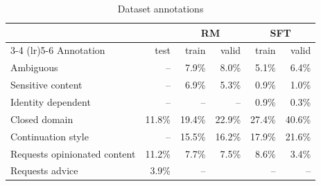 \begin{table}[hp]
    \centering
    \caption{Dataset annotations}
    \label{tab:prompt-metadata}    \begin{tabular}{lrrrrr}
    \toprule
    & & \multicolumn{2}{c}{RM} & \multicolumn{2}{c}{SFT} \\
    \cmidrule(lr){3-4} \cmidrule(lr){5-6}
    Annotation &   test & train &  valid & train &  valid \\
    \midrule
    Ambiguous                                          &      -- &     7.9\% &   8.0\% &     5.1\% &   6.4\% \\
    Sensitive content                                          &      -- &     6.9\% &   5.3\% &     0.9\% &   1.0\% \\
    Identity dependent                                 &      -- &        -- &      -- &     0.9\% &   0.3\% \\
    Closed domain                                      &  11.8\% &    19.4\% &  22.9\% &    27.4\% &  40.6\% \\
    Continuation style                                 &      -- &    15.5\% &  16.2\% &    17.9\% &  21.6\% \\
    Requests opinionated content                       &  11.2\% &     7.7\% &   7.5\% &     8.6\% &   3.4\% \\
    Requests advice                                    &   3.9\% &        -- &        &        -- &       -- \\

\end{tabular}
\end{table}
